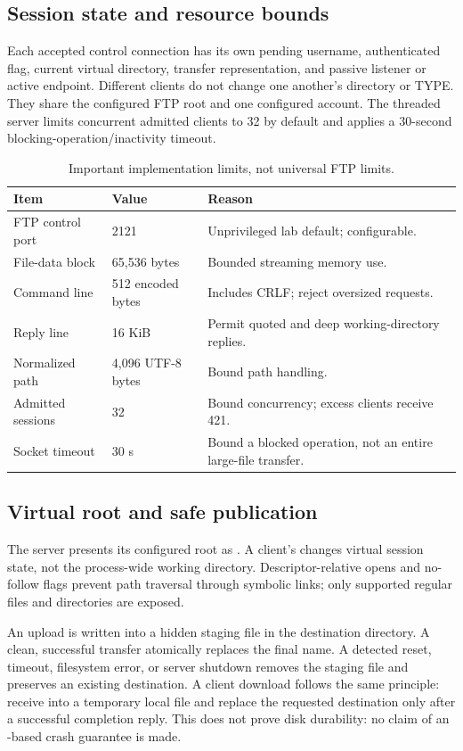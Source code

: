 \subsection{Session state and resource bounds}
Each accepted control connection has its own pending username, authenticated flag, current virtual directory, transfer representation, and passive listener or active endpoint. Different clients do not change one another's directory or TYPE. They share the configured FTP root and one configured account. The threaded server limits concurrent admitted clients to 32 by default and applies a 30-second blocking-operation/inactivity timeout.

\begin{table}[H]
\centering\small
\caption{Important implementation limits, not universal FTP limits.}
\begin{tabularx}{\linewidth}{@{}l l Y@{}}
\toprule
Item & Value & Reason \\
\midrule
FTP control port & 2121 & Unprivileged lab default; configurable. \\
File-data block & 65,536 bytes & Bounded streaming memory use. \\
Command line & 512 encoded bytes & Includes CRLF; reject oversized requests. \\
Reply line & 16 KiB & Permit quoted and deep working-directory replies. \\
Normalized path & 4,096 UTF-8 bytes & Bound path handling. \\
Admitted sessions & 32 & Bound concurrency; excess clients receive 421. \\
Socket timeout & 30 s & Bound a blocked operation, not an entire large-file transfer. \\
\bottomrule
\end{tabularx}
\end{table}

\subsection{Virtual root and safe publication}
The server presents its configured root as \code{/}. A client's  changes virtual session state, not the process-wide working directory. Descriptor-relative opens and no-follow flags prevent path traversal through symbolic links; only supported regular files and directories are exposed.

An upload is written into a hidden staging file in the destination directory. A clean, successful transfer atomically replaces the final name. A detected reset, timeout, filesystem error, or server shutdown removes the staging file and preserves an existing destination. A client download follows the same principle: receive into a temporary local file and replace the requested destination only after a successful completion reply. This does not prove disk durability: no claim of an -based crash guarantee is made.

